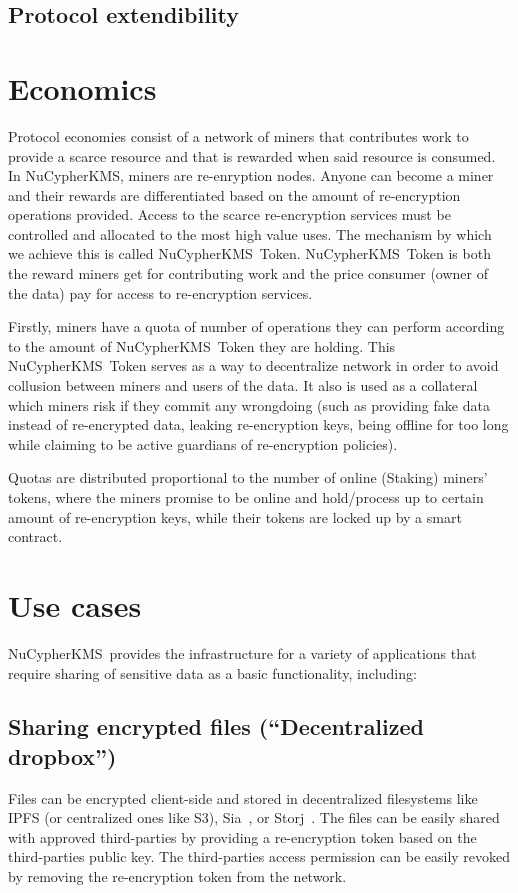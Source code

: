 \documentclass[notitlepage,longbibliography]{revtex4-1}
\newcommand{\kms}{NuCypherKMS}
\begin{document}
\subsection{Protocol extendibility}

\section{Economics}
Protocol economies consist of a network of miners that contributes work to provide a scarce resource and that is
rewarded when said resource is consumed.
In \kms, miners are re-enryption nodes.
Anyone can become a miner and their rewards are differentiated based on the amount of re-encryption operations provided.
Access to the scarce re-encryption services must be controlled and allocated to the most high value uses.
The mechanism by which we achieve this is called \kms~Token. \kms~Token is both the reward miners get for contributing
work and the price consumer (owner of the data) pay for access to re-encryption services.

Firstly, miners have a quota of number of operations they can perform according to the amount of \kms~Token they are holding.
This \kms~Token serves as a way to decentralize network in order to avoid collusion between miners and users of the data.
It also is used as a collateral which miners risk if they commit any wrongdoing (such as providing fake data instead of re-encrypted data, leaking
re-encryption keys, being offline for too long while claiming to be active guardians of re-encryption policies).

Quotas are distributed proportional to the number of online (Staking) miners' tokens,
where the miners promise to be online and hold/process up to certain amount of re-encryption keys,
while their tokens are locked up by a smart contract.

\section{Use cases}
\kms~provides the infrastructure for a variety of applications that require sharing of sensitive data as a basic
functionality, including:

\subsection{Sharing encrypted files (``Decentralized dropbox'')}
Files can be encrypted client-side and stored in decentralized filesystems like IPFS (or centralized ones like S3), Sia~\cite{web:sia}, or Storj~\cite{web:storj}.
The files can be easily shared with approved third-parties by providing a re-encryption token based on the third-parties
public key.
The third-parties access permission can be easily revoked by removing the re-encryption token from the network.
\end{document}
